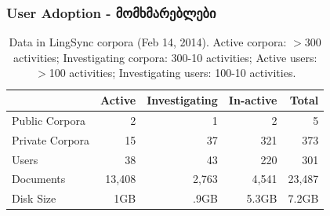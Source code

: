 \documentclass{beamer}
\begin{document}
\begin{frame}

\frametitle{User Adoption - მომხმარებლები}
\begin{table}[h]
\begin{center}
\scriptsize
\begin{tabular}{lrrrr}
      \toprule
                     ~ &  Active & Investigating & In-active & Total\\
      \midrule
      Public Corpora  &       2 &   1 &   2 & 5 \\
      Private Corpora &      15 &  37 & 321 & 373\\
      Users           &      38 &  43 & 220 & 301 \\
      Documents & 13,408 & 2,763 & 4,541 &23,487\\
      Disk Size & 1GB & .9GB & 5.3GB& 7.2GB\\

      \bottomrule

\end{tabular}
\caption{Data in LingSync corpora (Feb 14, 2014). Active corpora: $>$300
activities; Investigating corpora: 300-10 activities; Active users: $>$100
activities; Investigating users: 100-10 activities.}
\label{lingsync-data}
 \end{center}
 \normalsize
\end{table}

\end{frame}
\end{document}
